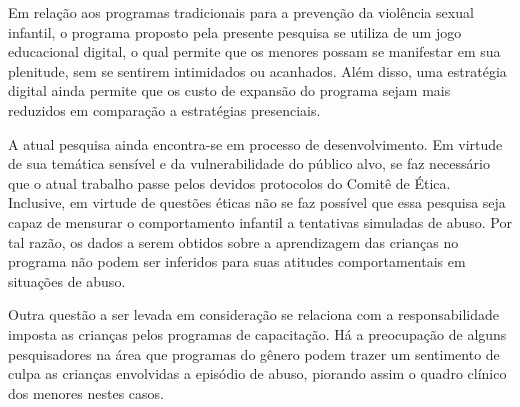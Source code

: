Em relação aos programas tradicionais para a prevenção da violência sexual infantil, o programa proposto pela presente pesquisa se utiliza de um jogo educacional digital, o qual permite que os menores possam se manifestar em sua plenitude, sem se sentirem intimidados ou acanhados. 
Além disso, uma estratégia digital ainda permite que os custo de expansão do programa sejam mais reduzidos em comparação a estratégias presenciais. 




A atual pesquisa ainda encontra-se em processo de desenvolvimento. Em virtude de sua temática sensível e da vulnerabilidade do público alvo, se faz necessário que o atual trabalho passe pelos devidos protocolos do Comitê de Ética. Inclusive, em virtude de questões éticas não se faz possível que essa pesquisa seja capaz de mensurar o comportamento infantil a tentativas simuladas de abuso. Por tal razão, os dados a serem obtidos sobre a aprendizagem das crianças no programa não podem ser inferidos para suas atitudes comportamentais em situações de abuso. 

\pagebreak

Outra questão a ser levada em consideração se relaciona com a responsabilidade imposta as crianças pelos programas de capacitação. Há a preocupação de alguns pesquisadores na área que programas do gênero podem trazer um sentimento de culpa as crianças envolvidas a episódio de abuso, piorando assim o quadro clínico dos menores nestes casos. 






